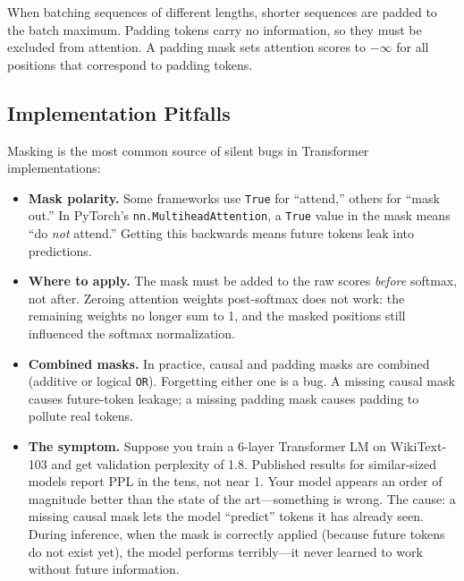 When batching sequences of different lengths, shorter sequences are padded to the batch maximum. Padding tokens carry no information, so they must be excluded from attention. A padding mask sets attention scores to $-\infty$ for all positions that correspond to padding tokens.

\subsection{Implementation Pitfalls}

Masking is the most common source of silent bugs in Transformer implementations:

\begin{itemize}
    \item \textbf{Mask polarity.} Some frameworks use \texttt{True} for ``attend,'' others for ``mask out.'' In PyTorch's \texttt{nn.MultiheadAttention}, a \texttt{True} value in the mask means ``do \emph{not} attend.'' Getting this backwards means future tokens leak into predictions.
    \item \textbf{Where to apply.} The mask must be added to the raw scores \emph{before} softmax, not after. Zeroing attention weights post-softmax does not work: the remaining weights no longer sum to 1, and the masked positions still influenced the softmax normalization.
    \item \textbf{Combined masks.} In practice, causal and padding masks are combined (additive or logical \texttt{OR}). Forgetting either one is a bug. A missing causal mask causes future-token leakage; a missing padding mask causes padding to pollute real tokens.
    \item \textbf{The symptom.} Suppose you train a 6-layer Transformer LM on WikiText-103 and get validation perplexity of 1.8. Published results for similar-sized models report PPL in the tens, not near 1. Your model appears an order of magnitude better than the state of the art---something is wrong. The cause: a missing causal mask lets the model ``predict'' tokens it has already seen. During inference, when the mask is correctly applied (because future tokens do not exist yet), the model performs terribly---it never learned to work without future information.
\end{itemize}

\medskip
\noindent{}
\medskip

